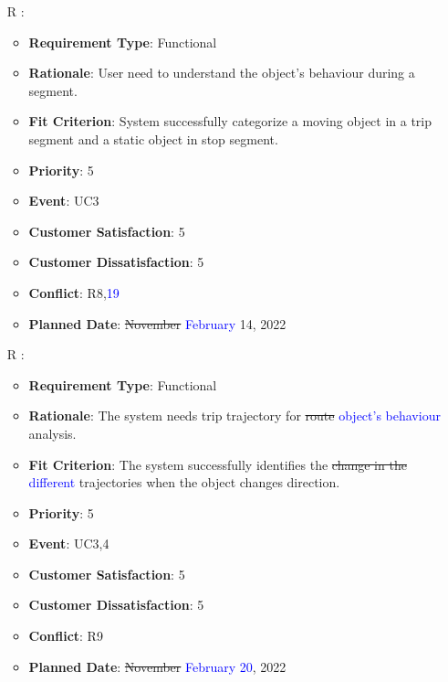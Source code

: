 \documentclass[12pt, titlepage]{article}
\newcounter{reqnum} %
\begin{document}
\begin{itemize}
\item[R\refstepcounter{reqnum}\thereqnum
\label{R_Outputs_2}:] 
\begin{itemize}
    \item \textbf{Requirement Type}: Functional
    \item \textbf{Rationale}: User need to understand the object's behaviour during a segment.
    \item \textbf{Fit Criterion}: System successfully categorize a moving object in a trip segment and a static object in stop segment.
    \item \textbf{Priority}: 5
    \item \textbf{Event}: UC3
    \item \textbf{Customer Satisfaction}: 5
    \item \textbf{Customer Dissatisfaction}: 5
    \item \textbf{Conflict}: R8,\textcolor{blue}{19}
    \item \textbf{Planned Date}: \sout{November} \textcolor{blue}{February} 14, 2022
\end{itemize}

\item[R\refstepcounter{reqnum}\thereqnum
\label{R_Inputs_1}:] 
\begin{itemize}
    \item \textbf{Requirement Type}: Functional
    \item \textbf{Rationale}: The system needs trip trajectory for \sout{route} \textcolor{blue}{object's behaviour} analysis. 
    \item \textbf{Fit Criterion}: The system successfully identifies the \sout{change in the} \textcolor{blue}{different} trajectories when the object changes direction. 
    \item \textbf{Priority}: 5
    \item \textbf{Event}: UC3,4
    \item \textbf{Customer Satisfaction}: 5
    \item \textbf{Customer Dissatisfaction}: 5
    \item \textbf{Conflict}: R9
    \item \textbf{Planned Date}: \sout{November} \textcolor{blue}{February 20}, 2022
\end{itemize}


\end{itemize}
\end{document}
